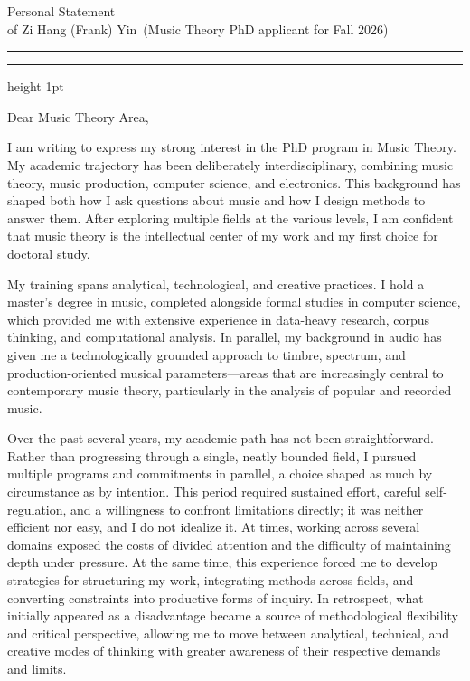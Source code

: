 \documentclass[9pt]{article}
\newcommand{\soptitle}{Personal Statement}
\newcommand{\yourname}{Zi Hang (Frank) Yin}
\begin{document}
\begin{center}\LARGE\soptitle\\
\large of \yourname\ (Music Theory PhD applicant for Fall 2026)
\end{center}

\hrule
\vspace{1pt}
\hrule height 1pt
\bigskip

\noindent Dear Music Theory Area, 
\bigskip

I am writing to express my strong interest in the PhD program in Music Theory. My academic trajectory has been deliberately interdisciplinary, combining music theory, music production, computer science, and electronics. This background has shaped both how I ask questions about music and how I design methods to answer them. After exploring multiple fields at the various levels, I am confident that music theory is the intellectual center of my work and my first choice for doctoral study.

My training spans analytical, technological, and creative practices. I hold a master’s degree in music, completed alongside formal studies in computer science, which provided me with extensive experience in data-heavy research, corpus thinking, and computational analysis. In parallel, my background in audio has given me a technologically grounded approach to timbre, spectrum, and production-oriented musical parameters—areas that are increasingly central to contemporary music theory, particularly in the analysis of popular and recorded music.



Over the past several years, my academic path has not been straightforward. Rather than progressing through a single, neatly bounded field, I pursued multiple programs and commitments in parallel, a choice shaped as much by circumstance as by intention. This period required sustained effort, careful self-regulation, and a willingness to confront limitations directly; it was neither efficient nor easy, and I do not idealize it. At times, working across several domains exposed the costs of divided attention and the difficulty of maintaining depth under pressure. At the same time, this experience forced me to develop strategies for structuring my work, integrating methods across fields, and converting constraints into productive forms of inquiry. In retrospect, what initially appeared as a disadvantage became a source of methodological flexibility and critical perspective, allowing me to move between analytical, technical, and creative modes of thinking with greater awareness of their respective demands and limits.
\end{document}
